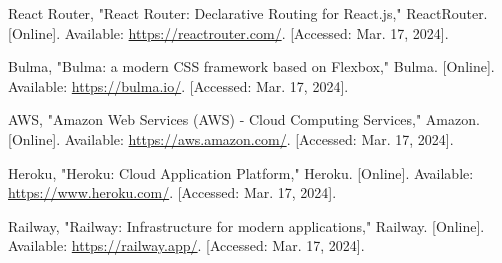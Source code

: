 \documentclass{report}
\begin{document}
\begin{thebibliography}{}
     React Router, "React Router: Declarative Routing for React.js," ReactRouter. [Online]. Available: \url{https://reactrouter.com/}. [Accessed: Mar. 17, 2024].

     Bulma, "Bulma: a modern CSS framework based on Flexbox," Bulma. [Online]. Available: \url{https://bulma.io/}. [Accessed: Mar. 17, 2024].

     AWS, "Amazon Web Services (AWS) - Cloud Computing Services," Amazon. [Online]. Available: \url{https://aws.amazon.com/}. [Accessed: Mar. 17, 2024].

     Heroku, "Heroku: Cloud Application Platform," Heroku. [Online]. Available: \url{https://www.heroku.com/}. [Accessed: Mar. 17, 2024].

     Railway, "Railway: Infrastructure for modern applications," Railway. [Online]. Available: \url{https://railway.app/}. [Accessed: Mar. 17, 2024].







    

\end{thebibliography}
\end{document}

